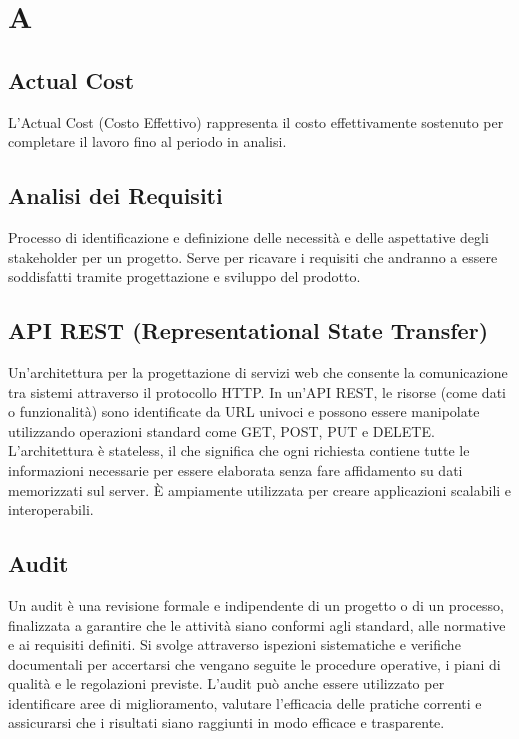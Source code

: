 \documentclass{article}
\begin{document}

\section{A}

\subsection{Actual Cost}
L’Actual Cost (Costo Effettivo) rappresenta il costo effettivamente sostenuto per completare il lavoro fino al periodo in analisi.

\subsection{Analisi dei Requisiti}
Processo di identificazione e definizione delle necessità e delle aspettative degli stakeholder per un progetto. Serve per ricavare i requisiti che andranno a essere soddisfatti tramite progettazione e sviluppo del prodotto.

\subsection{API REST (Representational State Transfer)}
Un'architettura per la progettazione di servizi web che consente la comunicazione tra sistemi attraverso il protocollo HTTP. In un'API REST, le risorse (come dati o funzionalità) sono identificate da URL univoci e possono essere manipolate utilizzando operazioni standard come GET, POST, PUT e DELETE. L'architettura è stateless, il che significa che ogni richiesta contiene tutte le informazioni necessarie per essere elaborata senza fare affidamento su dati memorizzati sul server. È ampiamente utilizzata per creare applicazioni scalabili e interoperabili.

\subsection{Audit}
Un audit è una revisione formale e indipendente di un progetto o di un processo, finalizzata a garantire che le attività siano conformi agli standard, alle normative e ai requisiti definiti. Si svolge attraverso ispezioni sistematiche e verifiche documentali per accertarsi che vengano seguite le procedure operative, i piani di qualità e le regolazioni previste. L’audit può anche essere utilizzato per identificare aree di miglioramento, valutare l’efficacia delle pratiche correnti e assicurarsi che i risultati siano raggiunti in modo efficace e trasparente.
\end{document}
